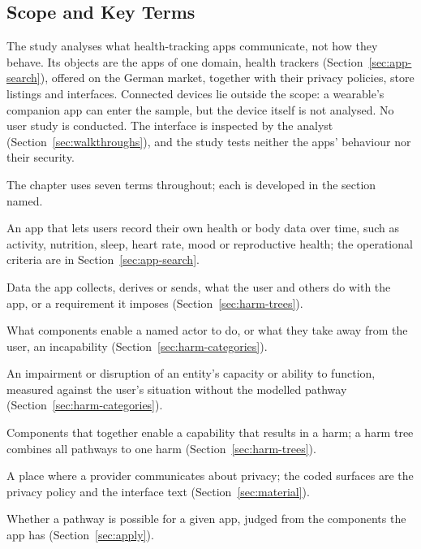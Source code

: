 \subsection{Scope and Key Terms}
\label{sec:scope}
The study analyses what health-tracking apps communicate, not how they behave. Its objects
are the apps of one domain, health trackers (Section~\ref{sec:app-search}), offered on the
German market, together with their privacy policies, store listings and interfaces.
Connected devices lie outside the scope: a wearable's companion app can enter the sample, but
the device itself is not analysed. No user study is conducted. The interface is inspected by
the analyst (Section~\ref{sec:walkthroughs}), and the study tests neither the apps' behaviour
nor their security.

The chapter uses seven terms throughout; each is developed in the section named.
\begin{description}[leftmargin=1.5em,itemsep=1pt,topsep=3pt,
                    labelindent=0pt,font=\normalfont\bfseries]
  \item[Health tracker] An app that lets users record their own health or body data over
    time, such as activity, nutrition, sleep, heart rate, mood or reproductive health; the
    operational criteria are in Section~\ref{sec:app-search}.
  \item[System component] Data the app collects, derives or sends, what the user and others do
    with the app, or a requirement it imposes (Section~\ref{sec:harm-trees}).
  \item[Capability] What components enable a named actor to do, or what they take away from the
    user, an incapability (Section~\ref{sec:harm-categories}).
  \item[Harm] An impairment or disruption of an entity's capacity or ability to function,
    measured against the user's situation without the modelled pathway
    (Section~\ref{sec:harm-categories}).
  \item[Pathway to harm] Components that together enable a capability that results in a harm;
    a harm tree combines all pathways to one harm (Section~\ref{sec:harm-trees}).
  \item[Surface] A place where a provider communicates about privacy; the coded surfaces are
    the privacy policy and the interface text (Section~\ref{sec:material}).
  \item[Applicability] Whether a pathway is possible for a given app, judged from the
    components the app has (Section~\ref{sec:apply}).
\end{description}

